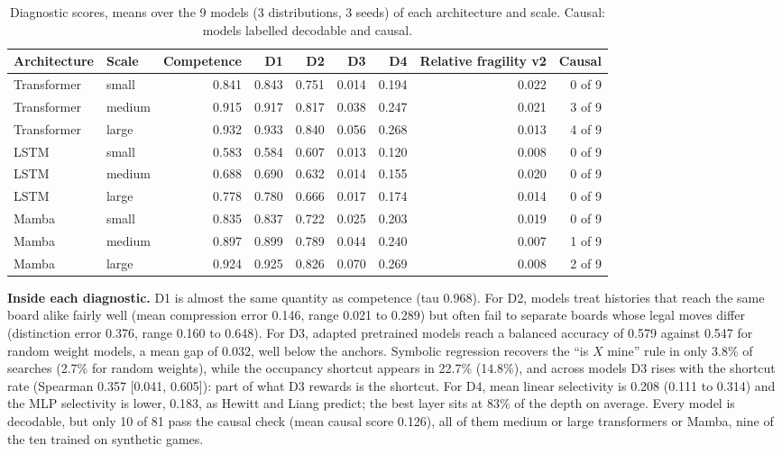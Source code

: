 \documentclass[journal]{IEEEtran}
\begin{document}
\begin{table}[t]
    \centering
    \caption{Diagnostic scores, means over the 9 models (3 distributions, 3 seeds) of each architecture and scale.
    Causal: models labelled decodable and causal.}
    \label{tab:descriptives}
    \footnotesize
    \begin{tabular}{llrrrrrrr}
    \toprule
    Architecture & Scale & Competence & D1 & D2 & D3 & D4 & Relative fragility v2 & Causal \\
    \midrule
    Transformer & small & 0.841 & 0.843 & 0.751 & 0.014 & 0.194 & 0.022 & 0 of 9 \\
    Transformer & medium & 0.915 & 0.917 & 0.817 & 0.038 & 0.247 & 0.021 & 3 of 9 \\
    Transformer & large & 0.932 & 0.933 & 0.840 & 0.056 & 0.268 & 0.013 & 4 of 9 \\
    LSTM & small & 0.583 & 0.584 & 0.607 & 0.013 & 0.120 & 0.008 & 0 of 9 \\
    LSTM & medium & 0.688 & 0.690 & 0.632 & 0.014 & 0.155 & 0.020 & 0 of 9 \\
    LSTM & large & 0.778 & 0.780 & 0.666 & 0.017 & 0.174 & 0.014 & 0 of 9 \\
    Mamba & small & 0.835 & 0.837 & 0.722 & 0.025 & 0.203 & 0.019 & 0 of 9 \\
    Mamba & medium & 0.897 & 0.899 & 0.789 & 0.044 & 0.240 & 0.007 & 1 of 9 \\
    Mamba & large & 0.924 & 0.925 & 0.826 & 0.070 & 0.269 & 0.008 & 2 of 9 \\
    \bottomrule
    \end{tabular}
\end{table}

\textbf{Inside each diagnostic.} D1 is almost the same quantity as competence (tau 0.968). For D2, models treat
histories that reach the same board alike fairly well (mean compression error 0.146, range 0.021 to 0.289) but often
fail to separate boards whose legal moves differ (distinction error 0.376, range 0.160 to 0.648). For D3, adapted
pretrained models reach a balanced accuracy of 0.579 against 0.547 for random weight models, a mean gap of 0.032,
well below the anchors. Symbolic regression recovers the ``is $X$ mine'' rule in only 3.8\% of searches (2.7\% for
random weights), while the occupancy shortcut appears in 22.7\% (14.8\%), and across models D3 rises with the
shortcut rate (Spearman 0.357 [0.041, 0.605]): part of what D3 rewards is the shortcut. For D4, mean linear
selectivity is 0.208 (0.111 to 0.314) and the MLP selectivity is lower, 0.183, as Hewitt and Liang predict; the best
layer sits at 83\% of the depth on average. Every model is decodable, but only 10 of 81 pass the causal check (mean
causal score 0.126), all of them medium or large transformers or Mamba, nine of the ten trained on synthetic games.
\end{document}
